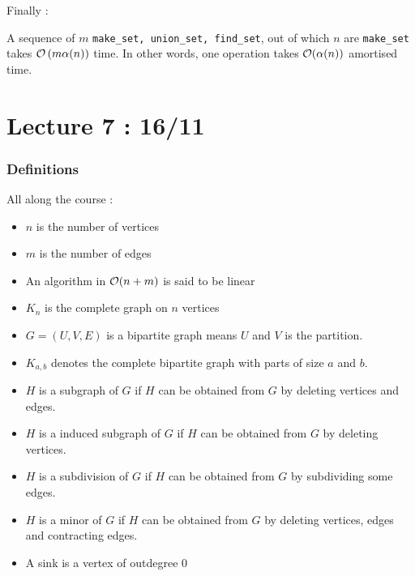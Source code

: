 \documentclass{cours}
\begin{document}
Finally : 

\begin{theorem}
    A sequence of $m$ \texttt{make_set, union_set, find_set}, out of which $n$ are \texttt{make_set} takes $\mathcal{O}\left(m \alpha(n)\right)$ time. In other words, one operation takes $\mathcal{O}(\alpha(n))$ amortised time.
\end{theorem}



\part[DFS-Matroids-MST]{Lecture 7 : 16/11}  %
\section{Definitions}
All along the course : 
\begin{definition}
    \begin{itemize}
        \item $n$ is the number of vertices
        \item $m$ is the number of edges
        \item An algorithm in $\mathcal{O}(n + m)$ is said to be linear
        \item $K_{n}$ is the complete graph on $n$ vertices
        \item $G = \left(U, V, E\right)$ is a bipartite graph means $U$ and $V$ is the partition.
        \item $K_{a, b}$ denotes the complete bipartite graph with parts of size $a$ and $b$.
        \item $H$ is a subgraph of $G$ if $H$ can be obtained from $G$ by deleting vertices and edges.
        \item $H$ is a induced subgraph of $G$ if $H$ can be obtained from $G$ by deleting vertices.
        \item $H$ is a subdivision of $G$ if $H$ can be obtained  from $G$ by subdividing some edges.
        \item $H$ is a minor of $G$ if $H$ can be obtained from $G$ by deleting vertices, edges and contracting edges.
        \item A sink is a vertex of outdegree 0
    \end{itemize}
\end{definition}
\end{document}
